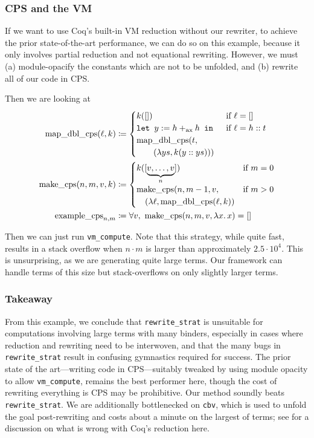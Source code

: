 \begin{subappendices}
\subsubsection{CPS and the VM}
If we want to use Coq's built-in VM reduction without our rewriter, to achieve the prior state-of-the-art performance, we can do so on this example, because it only involves partial reduction and not equational rewriting.
However, we must (a) module-opacify the constants which are not to be unfolded, and (b) rewrite all of our code in CPS.

Then we are looking at
\begin{align*}
    \text{map\_dbl\_cps}(\ell,k) & \defeq \begin{cases} k([]) & \text{if }\ell = [] \\
        \letin[{y := h +_\text{ax} h}{}] & \text{if }\ell = h::t \\
        \text{map\_dbl\_cps}(t, \\
        \qquad(\lambda ys, k(y :: ys)))
    \end{cases} \\
    \text{make\_cps}(n, m, v, k) & \defeq \begin{cases} k([\underbrace{v, \ldots, v}_n]) & \text{if }m = 0 \\
        \text{make\_cps}(n, m-1, v, & \text{if }m > 0 \\
        \quad(\lambda \ell,\text{map\_dbl\_cps}(\ell, k))
    \end{cases} \\
    \text{example\_cps}_{n, m} & \defeq \forall v,\ \text{make\_cps}(n, m, v, \lambda x.\,x) = []
\end{align*}

Then we can just run \texttt{vm\_compute}.
Note that this strategy, while quite fast, results in a stack overflow when $n \cdot m$ is larger than approximately $2.5\cdot 10^4$.
This is unsurprising, as we are generating quite large terms.
Our framework can handle terms of this size but stack-overflows on only slightly larger terms.

\subsubsection{Takeaway}

From this example, we conclude that \texttt{rewrite\_strat} is unsuitable for computations involving large terms with many binders, especially in cases where reduction and rewriting need to be interwoven, and that the many bugs in \texttt{rewrite\_strat} result in confusing gymnastics required for success.
The prior state of the art---writing code in CPS---suitably tweaked by using module opacity to allow \texttt{vm\_compute}, remains the best performer here, though the cost of rewriting everything is CPS may be prohibitive.
Our method soundly beats \texttt{rewrite\_strat}.
We are additionally bottlenecked on \texttt{cbv}, which is used to unfold the goal post-rewriting and costs about a minute on the largest of terms; see  for a discussion on what is wrong with Coq's reduction here.


\end{subappendices}
